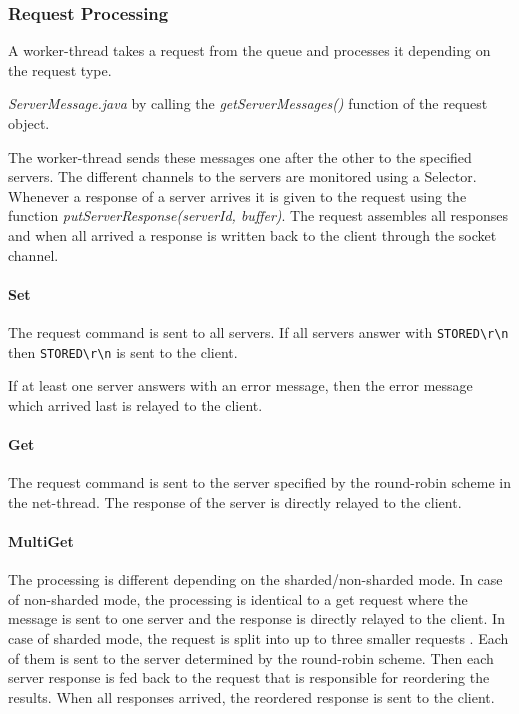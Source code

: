 \documentclass[11pt,a4paper]{article}
\begin{document}
\subsubsection{Request Processing}\label{request-processing}

A worker-thread takes a request from the queue and processes it depending on the request type.

\emph{ServerMessage.java} by calling the \emph{getServerMessages()} function of the request object.

The worker-thread sends these messages one after the other to the specified servers.
The different channels to the servers are monitored using a Selector. Whenever a response of a server arrives it 
is given to the request using the function \emph{putServerResponse(serverId, buffer)}. The request assembles all responses and when all arrived a response is written back to the client through the socket channel.

\paragraph{Set} The request command is sent to all servers. If all servers answer with \texttt{STORED\textbackslash r\textbackslash n} then \texttt{STORED\textbackslash r\textbackslash n} is sent to the client. 

If at least one server answers with an error message, then the error message which arrived last is relayed to the client.

\paragraph{Get} The request command is sent to the server specified by the round-robin scheme in the net-thread.
The response of the server is directly relayed to the client.

\paragraph{MultiGet} The processing is different depending on the sharded/non-sharded mode. In case of non-sharded mode, the processing is identical to a get request where the message is sent to one server and the response is directly relayed to the client. In case of sharded mode, the request is split into up to three smaller requests . Each of them is sent to the server determined by the round-robin scheme. Then each server response is fed back to the request that is responsible for reordering the results. When all responses arrived, the reordered response is sent to the client.
\end{document}
